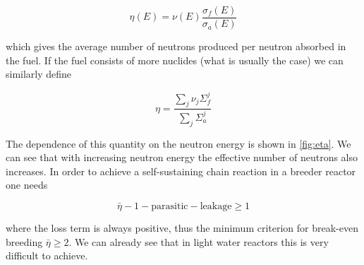 \begin{equation}
\eta(E)=\nu(E)\frac{\sigma_f(E)}{\sigma_a(E)}
\end{equation}

\noindent which gives the average number of neutrons produced per neutron absorbed in the fuel. If the fuel consists of more nuclides (what is usually the case) we can similarly define

\[
\eta=\frac{\sum_j\nu_j\Sigma_f^j}{\sum_j\Sigma_a^j}
\]

The dependence of this quantity on the neutron energy is shown in \autoref{fig:eta}. We can see that with increasing neutron energy the effective number of neutrons also increases. In order to achieve a self-sustaining chain reaction in a breeder reactor one needs

\begin{equation}
\bar\eta-1-\mathrm{parasitic}-\mathrm{leakage}\geq 1
\end{equation}

\noindent where the loss term is always positive, thus the minimum criterion for break-even breeding $\bar\eta\geq 2$. We can already see that in light water reactors this is very difficult to achieve.




%
